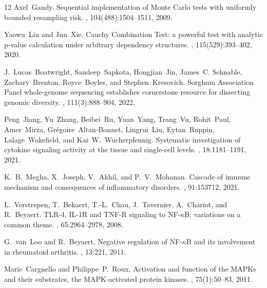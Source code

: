 \documentclass[unnumsec,webpdf,contemporary,large]{oup-authoring-template}%
\theoremstyle{thmstyleone}%
\theoremstyle{thmstyletwo}%
\theoremstyle{thmstylethree}%
\begin{document}
\begin{thebibliography}{12}
Axel~Gandy.
\newblock Sequential implementation of Monte Carlo tests with uniformly bounded resampling risk.
, 104(488):1504--1511, 2009.

Yaowu~Liu and Jun~Xie.
\newblock Cauchy Combination Test: a powerful test with analytic p-value calculation under arbitrary dependency structures.
, 115(529):393--402, 2020.

J.~Lucas~Boatwright, Sandeep~Sapkota, Hongjian~Jin, James~C. Schnable, Zachary~Brenton, Royce~Boyles, and Stephen~Kresovich.
\newblock Sorghum Association Panel whole-genome sequencing establishes cornerstone resource for dissecting genomic diversity.
, 111(3):888--904, 2022.

Peng~Jiang, Yu~Zhang, Beibei~Ru, Yuan~Yang, Trang~Vu, Rohit~Paul, Amer~Mirza, Gr{\'e}goire~Altan-Bonnet, Lingrui~Liu, Eytan~Ruppin, Lalage~Wakefield, and Kai~W.~Wucherpfennig.
\newblock Systematic investigation of cytokine signaling activity at the tissue and single-cell levels.
, 18:1181--1191, 2021.

K.~B.~Megha, X.~Joseph, V.~Akhil, and P.~V.~Mohanan.
\newblock Cascade of immune mechanism and consequences of inflammatory disorders.
, 91:153712, 2021.

L.~Verstrepen, T.~Bekaert, T.-L.~Chau, J.~Tavernier, A.~Chariot, and R.~Beyaert.
\newblock TLR-4, IL-1R and TNF-R signaling to NF-$\kappa$B: variations on a common theme.
, 65:2964--2978, 2008.

G.~van~Loo and R.~Beyaert.
\newblock Negative regulation of NF-$\kappa$B and its involvement in rheumatoid arthritis.
, 13:221, 2011.

Marie~Cargnello and Philippe~P.~Roux.
\newblock Activation and function of the MAPKs and their substrates, the MAPK-activated protein kinases.
, 75(1):50--83, 2011.


\end{thebibliography}
\end{document}
